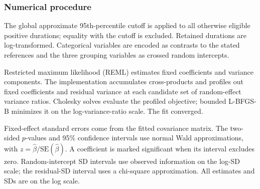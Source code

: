 \subsubsection{Numerical procedure}
The global approximate 95th-percentile cutoff is applied to all
otherwise eligible positive durations; equality with the cutoff is
excluded. Retained durations are log-transformed. Categorical
variables are encoded as contrasts to the stated references and the
three grouping variables as crossed random intercepts.

Restricted maximum likelihood (REML) estimates fixed coefficients
and variance components. The implementation accumulates
cross-products and profiles out fixed coefficients and residual
variance at each candidate set of random-effect variance ratios.
Cholesky solves evaluate the profiled objective; bounded L-BFGS-B
minimizes it on the log-variance-ratio scale. The fit converged.

Fixed-effect standard errors come from the fitted covariance matrix.
The two-sided \(p\)-values and 95\% confidence intervals use normal
Wald approximations, with \(z=\widehat\beta/
\mathrm{SE}(\widehat\beta)\). A coefficient is marked significant when
its interval excludes zero. Random-intercept SD intervals use observed
information on the log-SD scale; the residual-SD interval uses a
chi-square approximation. All estimates and SDs are on the log scale.

